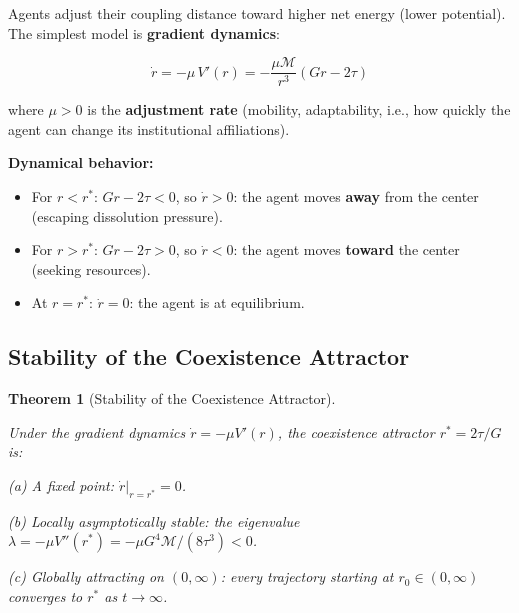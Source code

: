 \documentclass[11pt]{article}
\theoremstyle{plain}
\newtheorem{theorem}{Theorem}
\theoremstyle{definition}
\theoremstyle{remark}
\let\origsubsection\subsection
\renewcommand{\subsection}{\needspace{7\baselineskip}\origsubsection}
\providecommand{\tightlist}{%
  \setlength{\itemsep}{0pt}\setlength{\parskip}{0pt}}
\begin{document}
Agents adjust their coupling distance toward higher net energy (lower
potential). The simplest model is \textbf{gradient dynamics}:

\[\dot{r} = -\mu \, V'(r) = -\frac{\mu \mathcal{M}}{r^3}(Gr - 2\tau)\]

where \(\mu > 0\) is the \textbf{adjustment rate} (mobility,
adaptability, i.e., how quickly the agent can change its institutional
affiliations).

\textbf{Dynamical behavior:}

\begin{itemize}
\tightlist
\item
  For \(r < r^*\): \(Gr - 2\tau < 0\), so \(\dot{r} > 0\): the agent
  moves \textbf{away} from the center (escaping dissolution pressure).
\item
  For \(r > r^*\): \(Gr - 2\tau > 0\), so \(\dot{r} < 0\): the agent
  moves \textbf{toward} the center (seeking resources).
\item
  At \(r = r^*\): \(\dot{r} = 0\): the agent is at equilibrium.
\end{itemize}

\subsection{Stability of the Coexistence
Attractor}\label{stability-of-the-coexistence-attractor}

\begin{theorem}[Stability of the Coexistence Attractor]
\label{thm-stability-coexistence-attractor}

Under the gradient dynamics $\dot{r} = -\mu V'(r)$, the coexistence attractor $r^* = 2\tau/G$ is:

(a) A fixed point: $\dot{r}|_{r=r^*} = 0$.

(b) Locally asymptotically stable: the eigenvalue $\lambda = -\mu V''(r^*) = -\mu G^4 \mathcal{M} / (8\tau^3) < 0$.

(c) Globally attracting on $(0, \infty)$: every trajectory starting at $r_0 \in (0, \infty)$ converges to $r^*$ as $t \to \infty$.
\end{theorem}
\end{document}
